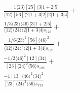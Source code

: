 \documentclass[varwidth, border=5pt]{standalone}
\begin{document}
\begin{my}
$\begin{gathered}
\scriptscriptstyle\frac{1⟨23⟩[25]⟨3|1+2|5]}{⟨12⟩[56]⟨2|1+3|2]⟨2|1+3|4]}+\\
\scriptscriptstyle\frac{1/3⟨23⟩⟨46⟩⟨3|1+2|5]}{⟨12⟩⟨24⟩⟨2|1+3|4]s_{123}}+\\
\scriptscriptstyle\frac{1/6⟨23⟩^2[56]⟨46⟩^2}{⟨12⟩⟨24⟩^2⟨2|1+3|4]s_{123}}+\\
\scriptscriptstyle\frac{-1/2⟨46⟩^2[12]⟨34⟩}{[23]⟨24⟩^2⟨56⟩s_{123}}+\\
\scriptscriptstyle\frac{-1[13]⟨46⟩^2⟨34⟩^2}{[23]⟨24⟩^3⟨56⟩s_{123}}\phantom{+}
\end{gathered}$
\end{my}
\end{document}
